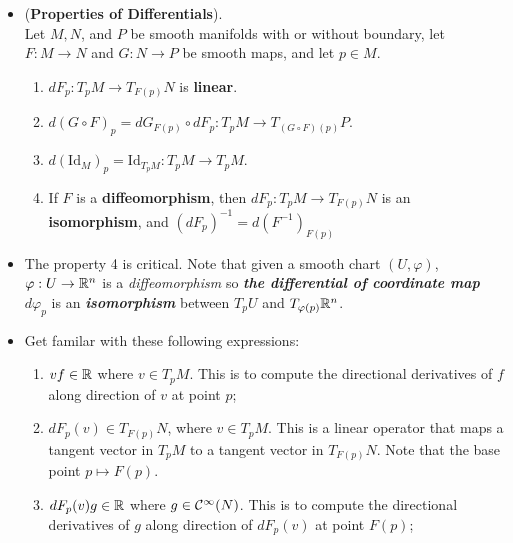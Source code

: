 \documentclass[11pt]{article}
\begin{document}
\begin{itemize}
\item \begin{proposition}\label{prop: diff_properties} (\textbf{Properties of Differentials}).\\
Let $M, N$, and $P$ be smooth manifolds with or without boundary, let $F: M \rightarrow N$ and $G: N \rightarrow P$ be smooth maps, and let $p \in M$.
\begin{enumerate}
\item $dF_{p}: T_{p}M \rightarrow T_{F(p)}N$ is \textbf{linear}.
\item $d(G \circ F)_{p} = dG_{F(p)} \circ dF_{p}: T_{p}M \rightarrow T_{(G \circ F)(p)}P$.
\item $d(\text{Id}_{M})_{p} = \text{Id}_{T_{p}M}: T_{p}M \rightarrow T_{p}M$.
\item If $F$ is a \textbf{diffeomorphism}, then $dF_{p}: T_{p}M \rightarrow T_{F(p)}N$ is an \textbf{isomorphism}, and
$(dF_{p})^{-1} = d(F^{-1})_{F(p)}$
\end{enumerate}
\end{proposition}

\item \begin{remark}
The property 4 is critical. Note that given a smooth chart $(U, \varphi)$, $\varphi: U\rightarrow {\mathbb R}^{n}$ is a \emph{diffeomorphism} so \emph{\textbf{the differential of coordinate map}} $d\varphi_p$ is an \textbf{\emph{isomorphism}} between $T_pU$ and $T_{\varphi(p)}{\mathbb R}^{n}$.
\end{remark}


\item \begin{remark}
Get familar with these following expressions:
\begin{enumerate}
\item $vf \in {\mathbb R}$ where $v\in T_pM$. This is to compute the directional derivatives of $f$ along direction of $v$ at point $p$;
\item $dF_p(v) \in T_{F(p)}N$, where $v\in T_pM$. This is a linear operator that maps a tangent vector in $T_pM$ to a tangent vector in $T_{F(p)}N$. Note that the base point $p \mapsto F(p)$.
\item $dF_p(v)g \in {\mathbb R}$ where $g \in {\mathcal C}^{\infty}(N)$. This is to  compute the directional derivatives of $g$ along direction of $dF_p(v)$ at point $F(p)$;
\end{enumerate}
\end{remark}

\end{itemize}
\end{document}
